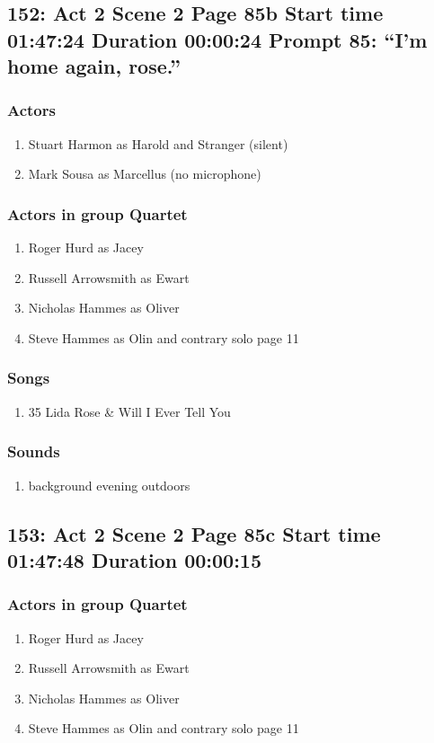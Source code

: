 \subsection{152: Act 2 Scene 2 Page 85b Start time 01:47:24 Duration 00:00:24 Prompt 85: ``I'm home again, rose.''}

\subsubsection{Actors}
\begin{enumerate}
\item Stuart Harmon as Harold and Stranger (silent)
\item Mark Sousa as Marcellus (no microphone)
\end{enumerate}
\subsubsection{Actors in group Quartet}
\begin{enumerate}
\item Roger Hurd as Jacey
\item Russell Arrowsmith as Ewart
\item Nicholas Hammes as Oliver
\item Steve Hammes as Olin and contrary solo page 11
\end{enumerate}

\subsubsection{Songs}
\begin{enumerate}
\item 35 Lida Rose \& Will I Ever Tell You
\end{enumerate}\subsubsection{Sounds}
\begin{enumerate}
\item background evening outdoors
\end{enumerate}
\subsection{153: Act 2 Scene 2 Page 85c Start time 01:47:48 Duration 00:00:15}

\subsubsection{Actors in group Quartet}
\begin{enumerate}
\item Roger Hurd as Jacey
\item Russell Arrowsmith as Ewart
\item Nicholas Hammes as Oliver
\item Steve Hammes as Olin and contrary solo page 11
\end{enumerate}

